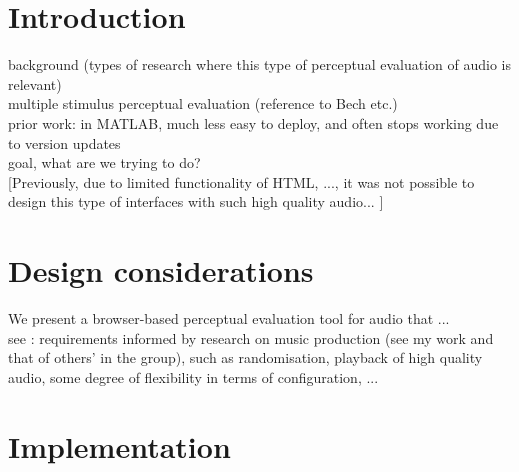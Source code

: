 \documentclass{article}
\title{\papertitle}
\begin{document}
%
\capstartfalse
\maketitle
\capstarttrue
%
\begin{abstract}
Place your abstract at the top left column on the first page.
Please write about 150-200 words that specifically highlight the purpose of your work,
its context, and provide a brief synopsis of your results.
Avoid equations in this part.\\
TOTAL PAPER: Minimum 4 pages, 6 preferred, max. 8 (6 for demos/posters)\\ 
\end{abstract}
%

\section{Introduction}\label{sec:introduction}

background (types of research where this type of perceptual evaluation of audio is relevant)\\

multiple stimulus perceptual evaluation (reference to Bech etc.)\\

prior work: \cite{deman2014b} in MATLAB, much less easy to deploy, and often stops working due to version updates \\ 

goal, what are we trying to do? \\

[Previously, due to limited functionality of HTML, ..., it was not possible to design this type of interfaces with such high quality audio... ]


\section{Design considerations}\label{sec:designconsiderations}

We present a browser-based perceptual evaluation tool for audio that ... \\

see \cite{deman2014b}: requirements informed by research on music production (see my work and that of others' in the group), such as randomisation, playback of high quality audio, some degree of flexibility in terms of configuration, ... \\


\section{Implementation}\label{sec:implementation}
\end{document}
